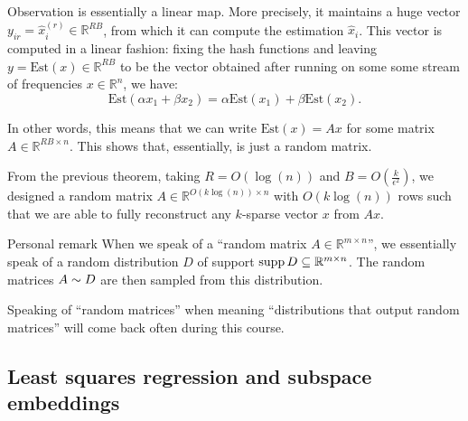 \documentclass[a4paper]{article}
\begin{document}
\begin{parag}{Observation}
     is essentially a linear map. More precisely, it maintains a huge vector $y_{i r} = \hat{x}_i^{\left(r\right)} \in \mathbb{R}^{RB}$, from which it can compute the estimation $\hat{x}_i$. This vector is computed in a linear fashion: fixing the hash functions and leaving $y = \text{Est}\left(x\right) \in \mathbb{R}^{RB}$ to be the vector obtained after running  on some some stream of frequencies $x \in \mathbb{R}^n$, we have: 
    \[\text{Est}\left(\alpha x_1 + \beta x_2\right) = \alpha \text{Est}\left(x_1\right) + \beta \text{Est}\left(x_2\right).\]

    In other words, this means that we can write $\text{Est}\left(x\right) = A x$ for some matrix $A \in \mathbb{R}^{RB \times n}$. This shows that, essentially,  is just a random matrix.

    From the previous theorem, taking $R = O\left(\log\left(n\right)\right)$ and $B = O\left(\frac{k}{\epsilon^2}\right)$, we designed a random matrix $A \in \mathbb{R}^{O\left(k\log\left(n\right)\right) \times n}$ with $O\left(k \log\left(n\right)\right)$ rows such that we are able to fully reconstruct any $k$-sparse vector $x$ from $Ax$.

    \begin{subparag}{Personal remark}
        When we speak of a ``random matrix $A \in \mathbb{R}^{m \times n}$'', we essentially speak of a random distribution $D$ of support $\operatorname{supp} D \subseteq \mathbb{R}^{m \times n}$. The random matrices $A \sim D$ are then sampled from this distribution.

        Speaking of ``random matrices'' when meaning ``distributions that output random matrices'' will come back often during this course.
    \end{subparag}
\end{parag}

\subsection{Least squares regression and subspace embeddings}
\end{document}
